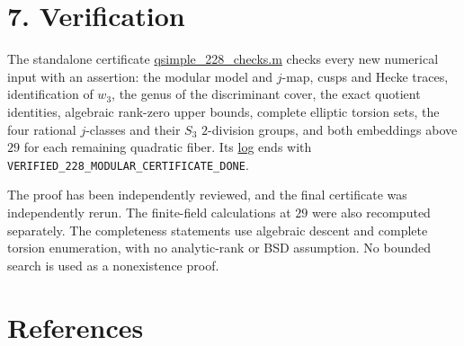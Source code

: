 \documentclass[
  11pt,
]{article}
\newcounter{none} %
\begin{document}
\section{7. Verification}\label{verification}

The standalone certificate
\href{https://genus-2-torsion.github.io/data/knowledge/sources/qsimple_228_checks.m}{qsimple\_228\_checks.m}
checks every new numerical input with an assertion: the modular model
and \(j\)-map, cusps and Hecke traces, identification of \(w_3\), the
genus of the discriminant cover, the exact quotient identities,
algebraic rank-zero upper bounds, complete elliptic torsion sets, the
four rational \(j\)-classes and their \(S_3\) \(2\)-division groups, and
both embeddings above \(29\) for each remaining quadratic fiber. Its
\href{https://genus-2-torsion.github.io/data/knowledge/sources/qsimple_228_checks.log}{log}
ends with \texttt{VERIFIED\_228\_MODULAR\_CERTIFICATE\_DONE}.

The proof has been independently reviewed, and the final certificate was
independently rerun. The finite-field calculations at \(29\) were also
recomputed separately. The completeness statements use algebraic descent
and complete torsion enumeration, with no analytic-rank or BSD
assumption. No bounded search is used as a nonexistence proof.

\section{References}\label{references}
\end{document}
